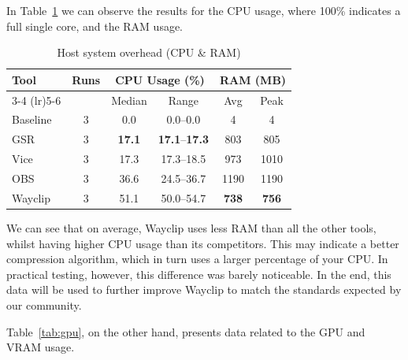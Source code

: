 In Table~\ref{tab:cpu_ram} we can observe the results for the CPU usage, where 100\% indicates a full single core, and the RAM usage.

\begin{table}[ht]
	\centering
	\small
	\caption{Host system overhead (CPU \& RAM)}
	\label{tab:cpu_ram}
	\begin{tabular}{l c cc cc}
		\toprule
		{\textbf{Tool}} & {\textbf{Runs}} & \multicolumn{2}{c}{\textbf{CPU Usage (\%)}} & \multicolumn{2}{c}{\textbf{RAM (MB)}}                                   \\
		\cmidrule(lr){3-4} \cmidrule(lr){5-6}
		                &                 & Median                                      & Range                                 & Avg            & Peak           \\
		\midrule
		Baseline        & 3               & \phantom{0}0.0                              & \phantom{0}0.0--0.0\phantom{0}        & \phantom{000}4 & \phantom{000}4 \\
		\midrule
		GSR             & 3               & \textbf{17.1}                               & \textbf{17.1}--\textbf{17.3}          & \phantom{0}803 & \phantom{0}805 \\
		Vice            & 3               & 17.3                                        & 17.3--18.5                            & \phantom{0}973 & 1010           \\
		OBS             & 3               & 36.6                                        & 24.5--36.7                            & 1190           & 1190           \\
		Wayclip         & 3               & 51.1                                        & 50.0--54.7                            & \textbf{738}   & \textbf{756}   \\
		\bottomrule
	\end{tabular}
\end{table}

We can see that on average, Wayclip uses less RAM than all the other tools, whilst having higher CPU usage than its competitors.
This may indicate a better compression algorithm, which in turn uses a larger percentage of your CPU. In practical testing, however, this difference was barely noticeable.
In the end, this data will be used to further improve Wayclip to match the standards expected by our community.

\bigskip

Table~\ref{tab:gpu}, on the other hand, presents data related to the GPU and VRAM usage.

